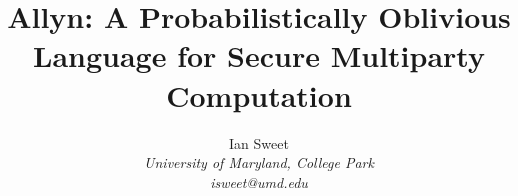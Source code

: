 \documentclass{report}
\newcommand{\lang}{Allyn\xspace}
\begin{document}
\title{\lang: A Probabilistically Oblivious Language for Secure Multiparty Computation}

\author{Ian Sweet \\
  \emph{University of Maryland, College Park} \\
  \emph{isweet@umd.edu}}

\date{}

\maketitle

\begin{abstract}  \end{abstract}

\tableofcontents










\appendix



\end{document}
